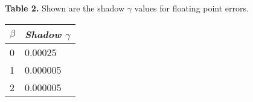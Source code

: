 \textbf{Table 2.} Shown are the shadow \(\gamma\) values for floating point errors.\\

\begin{table}[h!]
\begin{tabular}{|l|l|}
\hline
\textit{\(\beta\) } & \textit{Shadow \(\gamma\)} \\ \hline
0             & 0.00025               \\ \hline
1             & 0.000005              \\ \hline
2             & 0.000005              \\ \hline
\end{tabular}
\end{table}
